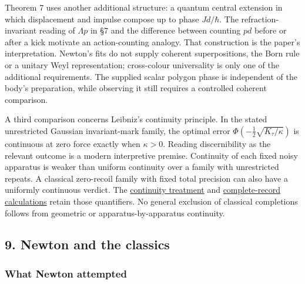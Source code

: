 \documentclass[11pt,a4paper]{article}
\begin{document}
Theorem 7 uses another additional structure: a quantum central extension
in which displacement and impulse compose up to phase \(Jd/\hbar\). The
refraction-invariant reading of \(\Lambda p\) in §7 and the difference
between counting \(p d\) before or after a kick motivate an
action-counting analogy. That construction is the paper's
interpretation. Newton's fits do not supply coherent superpositions, the
Born rule or a unitary Weyl representation; cross-colour universality is
only one of the additional requirements. The supplied scalar polygon
phase is independent of the body's preparation, while observing it still
requires a controlled coherent comparison.

A third comparison concerns Leibniz's continuity principle. In the
stated unrestricted Gaussian invariant-mark family, the optimal error
\(\Phi(-\tfrac12\sqrt{K_\tau/\kappa})\) is continuous at zero force
exactly when \(\kappa>0\). Reading discernibility as the relevant
outcome is a modern interpretive premise. Continuity of each fixed noisy
apparatus is weaker than uniform continuity over a family with
unrestricted repeats. A classical zero-recoil family with fixed total
precision can also have a uniformly continuous verdict. The
\href{leibniz-continuity-records.md}{continuity treatment} and
\href{sed-closure-under-recording.md}{complete-record calculations}
retain those quantifiers. No general exclusion of classical completions
follows from geometric or apparatus-by-apparatus continuity.

\hypertarget{newton-and-the-classics}{%
\subsection{9. Newton and the classics}\label{newton-and-the-classics}}

\hypertarget{what-newton-attempted}{%
\subsubsection{What Newton attempted}\label{what-newton-attempted}}
\end{document}
